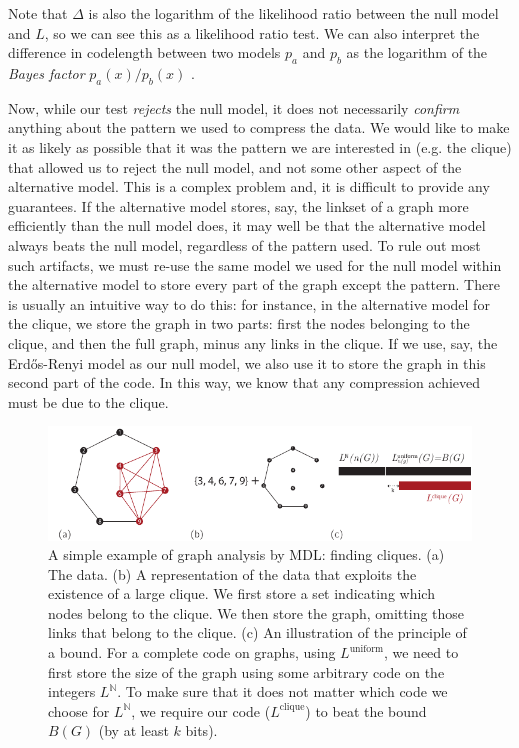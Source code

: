 \documentclass[twoside,11pt]{article}
\newcommand{\N}{{\mathbb N}}
\begin{document}
Note that $\Delta$ is also the logarithm of the likelihood ratio between the null model and $L$, so we can see this as a likelihood ratio test. We can also interpret the difference in codelength between two models $p_a$ and $p_b$  as the logarithm of the \emph{Bayes factor} $p_a(x)/p_b(x)$ \cite[Section~14.2.3]{grunwald2007minimum}. 

Now, while our test  \emph{rejects} the null model, it does not necessarily \emph{confirm} anything about the pattern we used to compress the data. We would like to make it as likely as possible that it was the pattern we are interested in (e.g. the clique) that allowed us to reject the null model, and not some other aspect of the alternative model. This is a complex problem and, it is difficult to provide any guarantees. If the alternative model stores, say, the linkset of a graph more efficiently than the null model does, it may well be that the alternative model always beats the null model, regardless of the pattern used. To rule out most such artifacts, we must re-use the same model we used for the null model within the alternative model to store every part of the graph except the pattern. There is usually an intuitive way to do this: for instance, in the alternative model for the clique, we store the graph in two parts: first the nodes belonging to the clique, and then the full graph, minus any links in the clique. If we use, say, the Erd\H{o}s-Renyi model as our null model, we also use it to store the graph in this second part of the code. In this way, we know that any compression achieved must be due to the clique.\footnotemark 


\begin{figure}[tb]
  \includegraphics[width=\textwidth]{./images/mdlexplanation.pdf}
  \caption{A simple example of graph analysis by MDL: finding cliques. (a) The data. (b) A representation of the data that exploits the existence of a large clique. We first store a set indicating which nodes belong to the clique. We then store the graph, omitting those links that belong to the clique. (c) An illustration of the principle of a bound. For a complete code on graphs, using $L^{\text{uniform}}$, we need to first store the size of the graph using some arbitrary code on the integers $L^\N$. To make sure that it does not matter which code we choose for $L^\N$, we require our code ($L^{\text{clique}}$) to beat the bound $B(G)$ (by at least $k$ bits). }
   \label{figure:clique-example}
\end{figure}  
\end{document}
